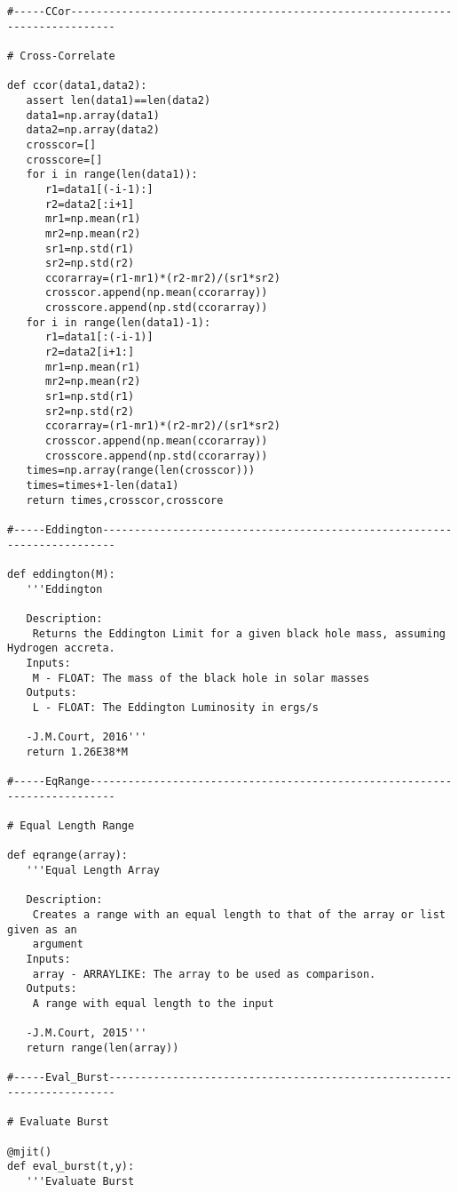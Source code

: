 \begin{verbatim}
#-----CCor-----------------------------------------------------------------------------

# Cross-Correlate

def ccor(data1,data2):
   assert len(data1)==len(data2)
   data1=np.array(data1)
   data2=np.array(data2)
   crosscor=[]
   crosscore=[]
   for i in range(len(data1)):
      r1=data1[(-i-1):]
      r2=data2[:i+1]
      mr1=np.mean(r1)
      mr2=np.mean(r2)
      sr1=np.std(r1)
      sr2=np.std(r2)
      ccorarray=(r1-mr1)*(r2-mr2)/(sr1*sr2)
      crosscor.append(np.mean(ccorarray))
      crosscore.append(np.std(ccorarray))
   for i in range(len(data1)-1):
      r1=data1[:(-i-1)]
      r2=data2[i+1:]
      mr1=np.mean(r1)
      mr2=np.mean(r2)
      sr1=np.std(r1)
      sr2=np.std(r2)
      ccorarray=(r1-mr1)*(r2-mr2)/(sr1*sr2)
      crosscor.append(np.mean(ccorarray))
      crosscore.append(np.std(ccorarray))
   times=np.array(range(len(crosscor)))
   times=times+1-len(data1)
   return times,crosscor,crosscore

#-----Eddington------------------------------------------------------------------------

def eddington(M):
   '''Eddington

   Description:
    Returns the Eddington Limit for a given black hole mass, assuming Hydrogen accreta.
   Inputs:
    M - FLOAT: The mass of the black hole in solar masses
   Outputs:
    L - FLOAT: The Eddington Luminosity in ergs/s

   -J.M.Court, 2016'''
   return 1.26E38*M

#-----EqRange--------------------------------------------------------------------------

# Equal Length Range

def eqrange(array):
   '''Equal Length Array

   Description:
    Creates a range with an equal length to that of the array or list given as an
    argument
   Inputs:
    array - ARRAYLIKE: The array to be used as comparison.
   Outputs:
    A range with equal length to the input

   -J.M.Court, 2015'''
   return range(len(array))

#-----Eval_Burst-----------------------------------------------------------------------

# Evaluate Burst

@mjit()
def eval_burst(t,y):
   '''Evaluate Burst


\end{verbatim}
